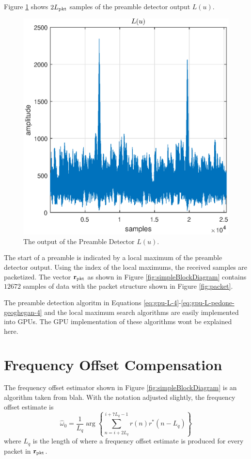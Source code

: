 Figure \ref{fig:L_2_packets} shows $2L_\text{pkt}$ samples of the preamble detector output $L(u)$.
\begin{figure}
	\centering\includegraphics[width=5in]{figures/gpu/L_2_packets.eps}
	\caption{The output of the Preamble Detector $L(u)$.}
	\label{fig:L_2_packets}
\end{figure}
The start of a preamble is indicated by a local maximum of the preamble detector output.
Using the index of the local maximums, the received samples are packetized.
The vector $\mathbf{r}_\text{pkt}$ as shown in Figure \ref{fig:simpleBlockDiagram} contains $12672$ samples of data with the packet structure shown in Figure \ref{fig:packet}.

The preamble detection algoritm in Equations \eqref{eq:gpu-L-4}-\eqref{eq:gpu-L-pedone-geoghegan-4} and the local maximum search algorithms are easily implemented into GPUs.
The GPU implementation of these algorithms wont be explained here.

\section{Frequency Offset Compensation}
\label{sec:frequency_offset_estimation_and_compensation}
The frequency offset estimator shown in Figure \ref{fig:simpleBlockDiagram} is an algorithm taken from blah.
With the notation adjusted slightly, the frequency offset estimate is
\begin{equation}
	\hat{\omega}_0 = \frac{1}{L_q} \arg\left\{ \sum_{n=i+2L_q}^{i+7L_q-1} r(n)r^\ast(n-L_q)\right\}
	\label{eq:jeff-ML-w-final3}
\end{equation}
where $L_q$ is the length of 
where a frequency offset estimate is produced for every packet in $\mathbf{r}_\text{pkt}$.


